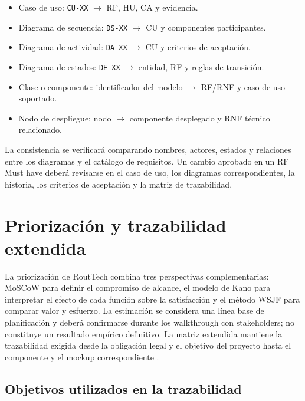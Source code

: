 \documentclass[12pt,a4paper]{article}
\begin{document}
\begin{itemize}
  \item Caso de uso: \texttt{CU-XX} $\rightarrow$ RF, HU, CA y evidencia.
  \item Diagrama de secuencia: \texttt{DS-XX} $\rightarrow$ CU y componentes participantes.
  \item Diagrama de actividad: \texttt{DA-XX} $\rightarrow$ CU y criterios de aceptación.
  \item Diagrama de estados: \texttt{DE-XX} $\rightarrow$ entidad, RF y reglas de transición.
  \item Clase o componente: identificador del modelo $\rightarrow$ RF/RNF y caso de uso soportado.
  \item Nodo de despliegue: nodo $\rightarrow$ componente desplegado y RNF técnico relacionado.
\end{itemize}

La consistencia se verificará comparando nombres, actores, estados y relaciones entre los diagramas y el catálogo de requisitos. Un cambio aprobado en un RF Must have deberá revisarse en el caso de uso, los diagramas correspondientes, la historia, los criterios de aceptación y la matriz de trazabilidad.



\section{Priorización y trazabilidad extendida}

La priorización de RoutTech combina tres perspectivas complementarias: MoSCoW para definir el compromiso de alcance, el modelo de Kano para interpretar el efecto de cada función sobre la satisfacción y el método WSJF para comparar valor y esfuerzo. La estimación se considera una línea base de planificación y deberá confirmarse durante los walkthrough con stakeholders; no constituye un resultado empírico definitivo. La matriz extendida mantiene la trazabilidad exigida desde la obligación legal y el objetivo del proyecto hasta el componente y el mockup correspondiente \cite{pohl2010,uteq2026}.

\subsection{Objetivos utilizados en la trazabilidad}
\end{document}
